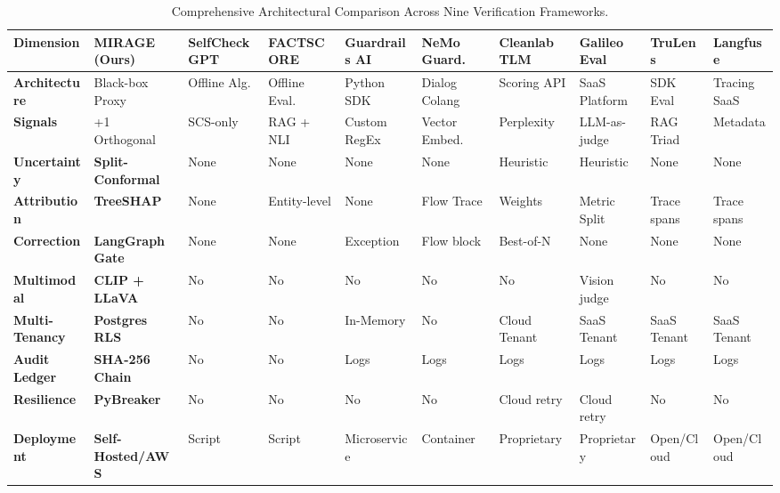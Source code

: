 \documentclass[11pt,a4paper]{article}
\begin{document}
\begin{table}[H]
\centering
\tiny
\renewcommand{\arraystretch}{1.25}
\begin{tabularx}{\linewidth}{p{2.0cm} *{9}{>{\centering\arraybackslash}X}}
\toprule
\textbf{Dimension} & \textbf{MIRAGE (Ours)} & \textbf{SelfCheckGPT} & \textbf{FACTSCORE} & \textbf{Guardrails AI} & \textbf{NeMo Guard.} & \textbf{Cleanlab TLM} & \textbf{Galileo Eval} & \textbf{TruLens} & \textbf{Langfuse} \\
\midrule
\textbf{Architecture} & Black-box Proxy & Offline Alg. & Offline Eval. & Python SDK & Dialog Colang & Scoring API & SaaS Platform & SDK Eval & Tracing SaaS \\
\textbf{Signals} & 4+1 Orthogonal & SCS-only & RAG + NLI & Custom RegEx & Vector Embed. & Perplexity & LLM-as-judge & RAG Triad & Metadata \\
\textbf{Uncertainty} & \textbf{Split-Conformal} & None & None & None & None & Heuristic & Heuristic & None & None \\
\textbf{Attribution} & \textbf{TreeSHAP} & None & Entity-level & None & Flow Trace & Weights & Metric Split & Trace spans & Trace spans \\
\textbf{Correction} & \textbf{LangGraph Gate} & None & None & Exception & Flow block & Best-of-N & None & None & None \\
\textbf{Multimodal} & \textbf{CLIP + LLaVA} & No & No & No & No & No & Vision judge & No & No \\
\textbf{Multi-Tenancy} & \textbf{Postgres RLS} & No & No & In-Memory & No & Cloud Tenant & SaaS Tenant & SaaS Tenant & SaaS Tenant \\
\textbf{Audit Ledger} & \textbf{SHA-256 Chain} & No & No & Logs & Logs & Logs & Logs & Logs & Logs \\
\textbf{Resilience} & \textbf{PyBreaker} & No & No & No & No & Cloud retry & Cloud retry & No & No \\
\textbf{Deployment} & \textbf{Self-Hosted/AWS} & Script & Script & Microservice & Container & Proprietary & Proprietary & Open/Cloud & Open/Cloud \\
\bottomrule
\end{tabularx}
\caption{Comprehensive Architectural Comparison Across Nine Verification Frameworks.}
\label{tab:competitive_analysis}
\end{table}
\end{document}
